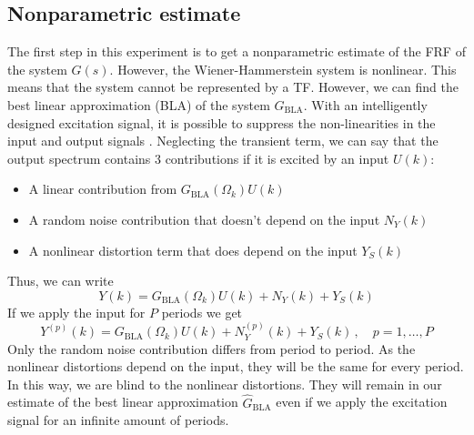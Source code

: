 \newpage
\subsection{Nonparametric estimate}
\label{sec:nonparametric_estimate_controller}
The first step in this experiment is to get a nonparametric estimate of the FRF of the system $G(s)$. However, the Wiener-Hammerstein system is nonlinear. This means that the system cannot be represented by a TF. However, we can find the best linear approximation (BLA) of the system $G_{\textrm{BLA}}$. With an intelligently designed excitation signal, it is possible to suppress the non-linearities in the input and output signals \cite{pintelon_book}. Neglecting the transient term, we can say that the output spectrum contains 3 contributions if it is excited by an input $U(k)$:
\begin{itemize}
	\item A linear contribution from $G_{\textrm{BLA}}(\Omega_k) U(k)$
	\item A random noise contribution that doesn't depend on the input $N_Y(k)$
	\item A nonlinear distortion term that does depend on the input $Y_S(k)$
\end{itemize}
Thus, we can write
\begin{equation*}
	Y(k) = G_{\textrm{BLA}}(\Omega_k) U(k) + N_Y(k) + Y_S(k)
\end{equation*}
If we apply the input for $P$ periods we get
\begin{equation*}
	Y^{(p)}(k) = G_{\textrm{BLA}}(\Omega_k) U(k) + N_Y^{(p)}(k) + Y_S(k) \,, \quad p = 1,\ldots,P
\end{equation*}
Only the random noise contribution differs from period to period. As the nonlinear distortions depend on the input, they will be the same for every period. In this way, we are blind to the nonlinear distortions. They will remain in our estimate of the best linear approximation $\hat G_{\textrm{BLA}}$ even if we apply the excitation signal for an infinite amount of periods.

